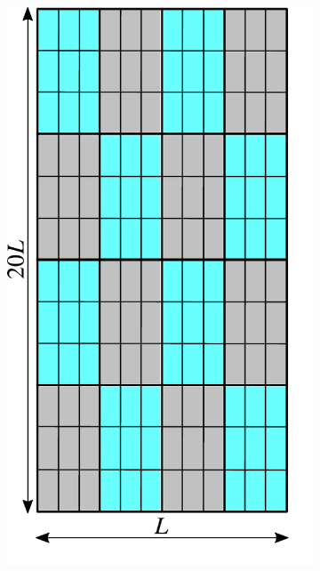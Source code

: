 \begin{figure} [htbp]
\begin{subfigure}[t]{0.22\textwidth}
  \centerline{\includegraphics[width=\linewidth]{figs/MsRSB/FE_12x12_a}}
  \caption{\label{fig:fem_demo_grid}}
\end{subfigure}
\hfill
\begin{subfigure}[t]{0.22\textwidth}

\end{subfigure}
\end{figure}
